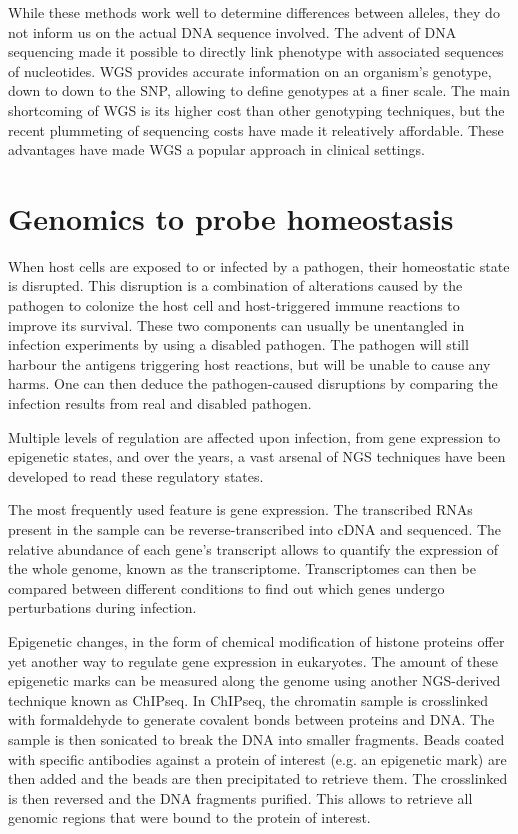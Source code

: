 While these methods work well to determine differences between alleles, they do not inform us on the actual DNA sequence involved. The advent of DNA sequencing made it possible to directly link phenotype with associated sequences of nucleotides. \acrfull{WGS} provides accurate information on an organism's genotype, down to down to the \acrfull{SNP}, allowing to define genotypes at a finer scale. The main shortcoming of \acrshort{WGS} is its higher cost than other genotyping techniques, but the recent plummeting of sequencing costs have made it releatively affordable. These advantages have made \acrshort{WGS} a popular approach in clinical settings.

\section{Genomics to probe homeostasis}

When host cells are exposed to or infected by a pathogen, their homeostatic state is disrupted. This disruption is a combination of alterations caused by the pathogen to colonize the host cell and host-triggered immune reactions to improve its survival. These two components can usually be unentangled in infection experiments by using a disabled pathogen. The pathogen will still harbour the antigens triggering host reactions, but will be unable to cause any harms. One can then deduce the pathogen-caused disruptions by comparing the infection results from real and disabled pathogen. 

Multiple levels of regulation are affected upon infection, from gene expression to epigenetic states, and over the years, a vast arsenal of NGS techniques have been developed to read these regulatory states. 

The most frequently used feature is gene expression. The transcribed RNAs present in the sample can be reverse-transcribed into cDNA and sequenced. The relative abundance of each gene's transcript allows to quantify the expression of the whole genome, known as the transcriptome. Transcriptomes can then be compared between different conditions to find out which genes undergo perturbations during infection. 

Epigenetic changes, in the form of chemical modification of histone proteins offer yet another way to regulate gene expression in eukaryotes. The amount of these epigenetic marks can be measured along the genome using another NGS-derived technique known as \acrfull{ChIPseq}. In \acrshort{ChIPseq}, the chromatin sample is crosslinked with formaldehyde to generate covalent bonds between proteins and DNA. The sample is then sonicated to break the DNA into smaller fragments. Beads coated with specific antibodies against a protein of interest (e.g. an epigenetic mark) are then added and the beads are then precipitated to retrieve them. The crosslinked is then reversed and the DNA fragments purified. This allows to retrieve all genomic regions that were bound to the protein of interest. 


